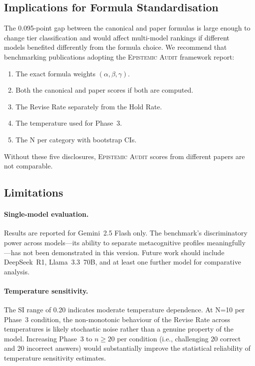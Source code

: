 \documentclass[12pt,a4paper]{article}
\newcommand{\EA}{\textsc{Epistemic Audit}}
\begin{document}
\subsection{Implications for Formula Standardisation}

The 0.095-point gap between the canonical and paper formulas is large enough to
change tier classification and would affect multi-model rankings if different models
benefited differently from the formula choice. We recommend that benchmarking publications
adopting the \EA{} framework report:

\begin{enumerate}[leftmargin=2em]
    \item The exact formula weights $(\alpha, \beta, \gamma)$.
    \item Both the canonical and paper scores if both are computed.
    \item The Revise Rate separately from the Hold Rate.
    \item The temperature used for Phase~3.
    \item The N per category with bootstrap CIs.
\end{enumerate}

Without these five disclosures, \EA{} scores from different papers are not comparable.

\subsection{Limitations}

\paragraph{Single-model evaluation.}
Results are reported for Gemini~2.5 Flash only. The benchmark's discriminatory power across
models---its ability to separate metacognitive profiles meaningfully---has not been
demonstrated in this version. Future work should include DeepSeek~R1, Llama~3.3~70B,
and at least one further model for comparative analysis.

\paragraph{Temperature sensitivity.}
The SI range of 0.20 indicates moderate temperature dependence. At N=10 per Phase~3
condition, the non-monotonic behaviour of the Revise Rate across temperatures is likely
stochastic noise rather than a genuine property of the model. Increasing Phase~3 to
$n \geq 20$ per condition (i.e., challenging 20 correct and 20 incorrect answers) would
substantially improve the statistical reliability of temperature sensitivity estimates.
\end{document}
